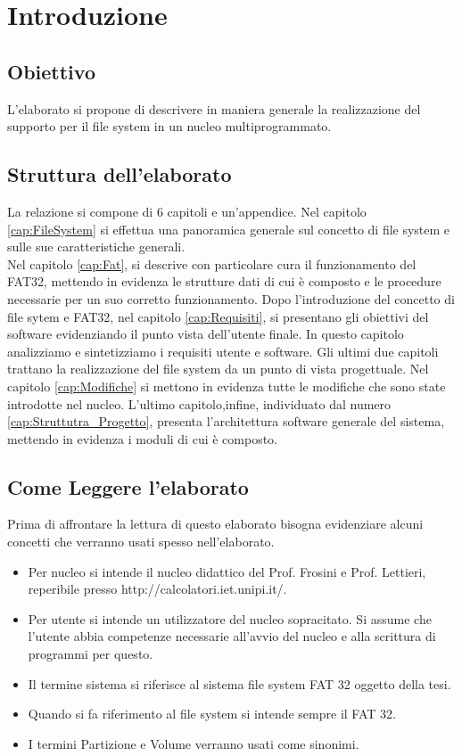 \chapter{Introduzione}
\label{chap:Intro}
\section{Obiettivo}
L'elaborato si propone di descrivere in maniera generale la realizzazione del supporto per il file system in un nucleo multiprogrammato.
\section{Struttura dell'elaborato}
La relazione si compone di 6 capitoli e un'appendice. 
Nel capitolo \ref{cap:FileSystem} si effettua una panoramica generale sul concetto di file system e sulle sue caratteristiche generali.\\
Nel capitolo \ref{cap:Fat}, si descrive con particolare cura il funzionamento del FAT32, mettendo in evidenza le strutture dati di cui è composto e le procedure necessarie per un suo corretto funzionamento. 
Dopo l'introduzione del concetto di file sytem e FAT32, nel capitolo  \ref{cap:Requisiti}, si presentano gli obiettivi del software evidenziando il punto vista dell'utente finale. In questo capitolo analizziamo e sintetizziamo i requisiti utente e software. 
Gli ultimi due capitoli trattano la realizzazione del file system da un punto di vista progettuale. Nel capitolo \ref{cap:Modifiche} si mettono in evidenza tutte le modifiche che sono state introdotte nel nucleo. 
L'ultimo capitolo,infine, individuato dal numero \ref{cap:Struttutra_Progetto}, presenta l'architettura software generale del sistema, mettendo in evidenza i moduli di cui è composto. 

\section{Come Leggere l'elaborato}
Prima di affrontare la lettura di questo elaborato bisogna evidenziare alcuni concetti che verranno usati spesso nell'elaborato. 
\begin{itemize}
  \item Per nucleo si intende il nucleo didattico del Prof. Frosini e Prof. Lettieri, reperibile presso http://calcolatori.iet.unipi.it/. 
  \item Per utente si intende un utilizzatore del nucleo sopracitato. Si assume che l'utente abbia competenze necessarie all'avvio del nucleo e alla scrittura di programmi per questo. 
  \item Il termine sistema si riferisce al sistema file system FAT 32 oggetto della tesi. 
  \item Quando si fa riferimento al file system si intende sempre il FAT 32.  
  \item I termini Partizione e Volume verranno usati come sinonimi. 
\end{itemize}

   